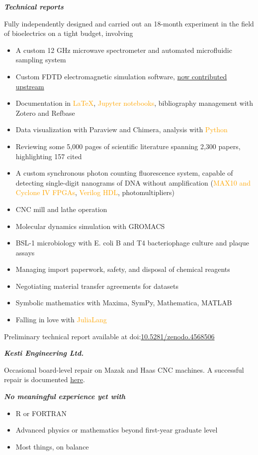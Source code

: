\documentclass[fleqn,11pt]{article}
\newcommand{\ressection}[1]{\textbf{{\Large \textit{#1}}}\xrfill[0.1ex]{0.6pt}}
\newcommand{\sk}[1]{\textcolor{orange}{#1}}
\newcommand{\itemoptions}{\setlength{\itemindent}{-10pt} \setlength\itemsep{-1em}}
\begin{document}
\ressection{Technical reports}

Fully independently designed and carried out an 18-month experiment in the field of bioelectrics on a tight budget, involving
\begin{itemize}\itemoptions
	\item A custom 12 GHz microwave spectrometer and automated microfluidic sampling system
	\item Custom FDTD electromagnetic simulation software, \href{https://github.com/flaport/fdtd/pull/27}{now contributed upstream} 
	\item Documentation in \sk{LaTeX}, \sk{Jupyter notebooks}, bibliography management with Zotero and Refbase
	\item Data visualization with Paraview and Chimera, analysis with \sk{Python}
	\item Reviewing some 5,000 pages of scientific literature spanning 2,300 papers, highlighting 157 cited
	\item A custom synchronous photon counting fluorescence system, capable of detecting single-digit nanograms of DNA without amplification (\sk{MAX10 and Cyclone IV FPGAs}, \sk{Verilog HDL}, photomultipliers)
	\item CNC mill and lathe operation
	\item Molecular dynamics simulation with GROMACS
	\item BSL-1 microbiology with E. coli B and T4 bacteriophage culture and plaque assays
	\item Managing import paperwork, safety, and disposal of chemical reagents
	\item Negotiating material transfer agreements for datasets
	\item Symbolic mathematics with Maxima, SymPy, Mathematica, MATLAB
	\item Falling in love with \sk{JuliaLang}
\end{itemize}

Preliminary technical report available at doi:\href{https://doi.org/10.5281/zenodo.4568506}{10.5281/zenodo.4568506}

\ressection{Kesti Engineering Ltd.}

Occasional board-level repair on Mazak and Haas CNC machines. A successful repair is documented \href{https://0xdbfb7.com/meldas.html}{here}.

\ressection{No meaningful experience yet with}

\begin{itemize}\itemoptions
	\item R or FORTRAN
	\item Advanced physics or mathematics beyond first-year graduate level
	\item Most things, on balance
\end{itemize}
\end{document}
